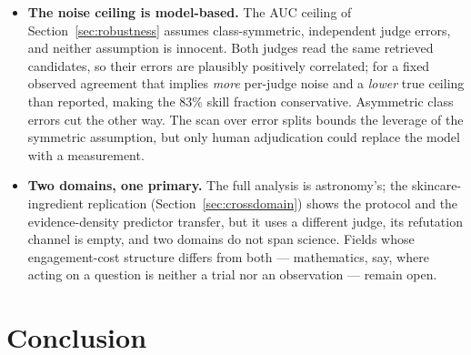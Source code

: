 \documentclass[11pt]{article}
\begin{document}
\begin{itemize}
    need 2{,}000--5{,}000 questions is confirmed empirically.
  \item \textbf{The noise ceiling is model-based.} The AUC ceiling of
    Section~\ref{sec:robustness} assumes class-symmetric, independent
    judge errors, and neither assumption is innocent. Both judges read
    the same retrieved candidates, so their errors are plausibly
    positively correlated; for a fixed observed agreement that implies
    \emph{more} per-judge noise and a \emph{lower} true ceiling than
    reported, making the 83\% skill fraction conservative. Asymmetric
    class errors cut the other way. The scan over error splits bounds
    the leverage of the symmetric assumption, but only human
    adjudication could replace the model with a measurement.
  \item \textbf{Two domains, one primary.} The full analysis is
    astronomy's; the skincare-ingredient replication
    (Section~\ref{sec:crossdomain}) shows the protocol and the
    evidence-density predictor transfer, but it uses a different judge,
    its refutation channel is empty, and two domains do not span
    science. Fields whose engagement-cost structure differs from both
    --- mathematics, say, where acting on a question is neither a trial
    nor an observation --- remain open.
\end{itemize}

\section{Conclusion}
\label{sec:conclusion}
\end{document}
